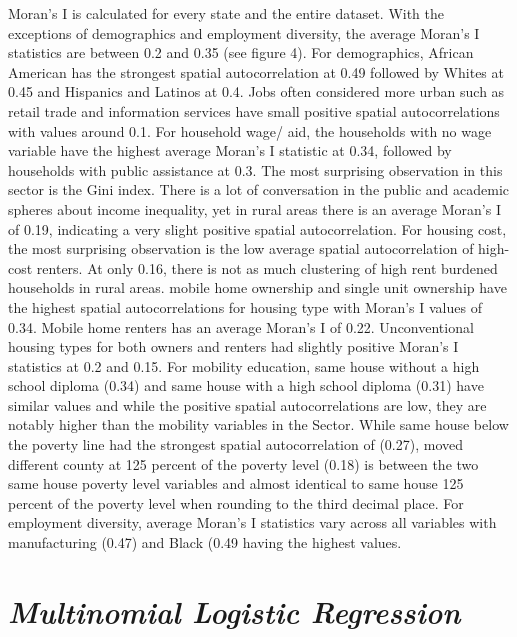 Moran’s I is calculated for every state and the entire dataset. With the exceptions of demographics and employment diversity, the average Moran's I statistics are between 0.2 and 0.35 (see figure 4). For demographics, African American has the strongest spatial autocorrelation at 0.49 followed by Whites at 0.45 and Hispanics and Latinos at 0.4. Jobs often considered more urban such as retail trade and information services have small positive spatial autocorrelations with values around 0.1. For household wage/ aid, the households with no wage variable have the highest average Moran’s I statistic at 0.34, followed by households with public assistance at 0.3. The most surprising observation in this sector is the Gini index. There is a lot of conversation in the public and academic spheres about income inequality, yet in rural areas there is an average Moran’s I of 0.19, indicating a very slight positive spatial autocorrelation. For housing cost, the most surprising observation is the low average spatial autocorrelation of high-cost renters. At only 0.16, there is not as much clustering of high rent burdened households in rural areas. mobile home ownership and single unit ownership have the highest spatial autocorrelations for housing type with Moran’s I values of 0.34.  Mobile home renters has an average Moran’s I of 0.22. Unconventional housing types for both owners and renters had slightly positive Moran’s I statistics at 0.2 and 0.15. For mobility education, same house without a high school diploma (0.34) and same house with a high school diploma (0.31) have similar values and while the positive spatial autocorrelations are low, they are notably higher than the mobility variables in the Sector. While same house below the poverty line had the strongest spatial autocorrelation of (0.27), moved different county at 125 percent of the poverty level (0.18) is between the two same house poverty level variables and almost identical to same house 125 percent of the poverty level when rounding to the third decimal place. For employment diversity, average Moran’s I statistics vary across all variables with manufacturing (0.47) and Black (0.49 having the highest values.  


\section{\textit{Multinomial Logistic Regression}}

